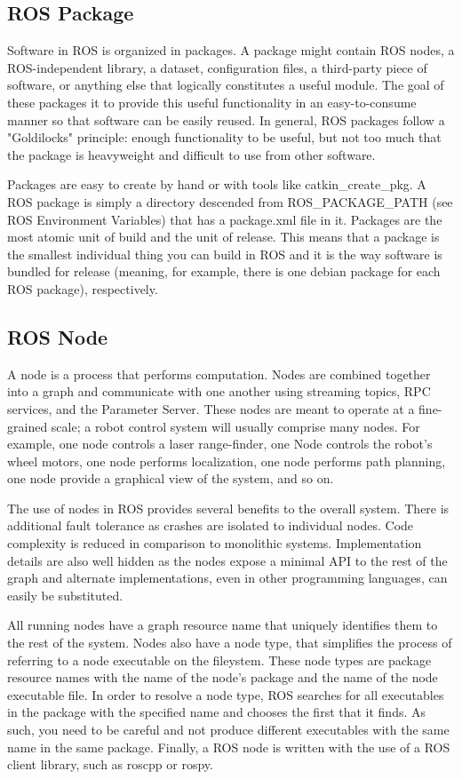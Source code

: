 \subsection{ROS Package}
	Software in ROS is organized in packages. A package might contain ROS nodes, a ROS-independent library, a dataset, configuration files, a third-party piece of software, or anything else that logically constitutes a useful module. The goal of these packages it to provide this useful functionality in an easy-to-consume manner so that software can be easily reused. In general, ROS packages follow a "Goldilocks" principle: enough functionality to be useful, but not too much that the package is heavyweight and difficult to use from other software.
	
	Packages are easy to create by hand or with tools like catkin\_create\_pkg. A ROS package is simply a directory descended from ROS\_PACKAGE\_PATH (see ROS Environment Variables) that has a package.xml file in it. Packages are the most atomic unit of build and the unit of release. This means that a package is the smallest individual thing you can build in ROS and it is the way software is bundled for release (meaning, for example, there is one debian package for each ROS package), respectively.
	
\subsection{ROS Node}
	
	A node is a process that performs computation. Nodes are combined together into a graph and communicate with one another using streaming topics, RPC services, and the Parameter Server. These nodes are meant to operate at a fine-grained scale; a robot control system will usually comprise many nodes. For example, one node controls a laser range-finder, one Node controls the robot's wheel motors, one node performs localization, one node performs path planning, one node provide a graphical view of the system, and so on.
	
	The use of nodes in ROS provides several benefits to the overall system. There is additional fault tolerance as crashes are isolated to individual nodes. Code complexity is reduced in comparison to monolithic systems. Implementation details are also well hidden as the nodes expose a minimal API to the rest of the graph and alternate implementations, even in other programming languages, can easily be substituted.
	
	All running nodes have a graph resource name that uniquely identifies them to the rest of the system. Nodes also have a node type, that simplifies the process of referring to a node executable on the fileystem. These node types are package resource names with the name of the node's package and the name of the node executable file. In order to resolve a node type, ROS searches for all executables in the package with the specified name and chooses the first that it finds. As such, you need to be careful and not produce different executables with the same name in the same package. Finally, a ROS node is written with the use of a ROS client library, such as roscpp or rospy.
	
